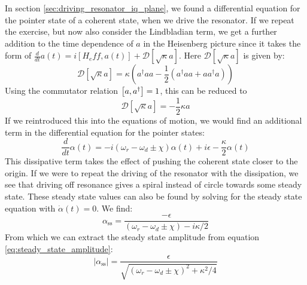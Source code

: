 In section \ref{sec:driving_resonator_iq_plane}, we found a differential equation for the pointer state of a coherent state, when we drive the resonator. If we repeat the exercise, but now also consider the Lindbladian term, we get a further addition to the time dependence of $a$ in the Heisenberg picture since it takes the form of $\frac{d}{dt}a(t) = i[H_eff, a(t)] +  \mathcal{D}[\sqrt{\kappa}a]$. Here $\mathcal{D}[\sqrt{\kappa}a]$ is given by:
\begin{equation}
    \mathcal{D}[\sqrt{\kappa}a] = \kappa \left(a^\dagger a a -\frac12 \left(a^\dagger a a + a a^\dagger a \right) \right)
\end{equation}
Using the commutator relation $\comm{a}{a^\dagger} = 1$, this can be reduced to
\begin{equation}
    \mathcal{D}[\sqrt{\kappa}a] = -\frac{1}{2}\kappa a 
\end{equation}
If we reintroduced this into the equations of motion, we would find an additional term in the differential equation for the pointer states:
\begin{equation}\label{eq:resonator_movement}
    \frac{d}{dt}\alpha(t) = - i \left(\omega_r - \omega_d \pm \chi\right) \alpha(t) + i\epsilon - \frac{\kappa}{2}\alpha(t) 
\end{equation}
This dissipative term takes the effect of pushing the coherent state closer to the origin. If we were to repeat the driving of the resonator with the dissipation, we see that driving off resonance gives a spiral instead of circle towards some steady state. These steady state values can also be found by solving for the steady state equation with $\dot{\alpha}(t) = 0$. We find:
\begin{equation}
    \alpha_{\text{ss}} = \frac{-\epsilon}{(\omega_r - \omega_d \pm \chi) - i \kappa / 2}
\end{equation}
From which we can extract the steady state amplitude from equation \ref{eq:steady_state_amplitude}:
\begin{equation}\label{eq:steady_state_amplitude}
    |\alpha_{\text{ss}}| = \frac{\epsilon}{\sqrt{(\omega_r - \omega_d \pm \chi)^2 + \kappa^2 / 4}}
\end{equation}




